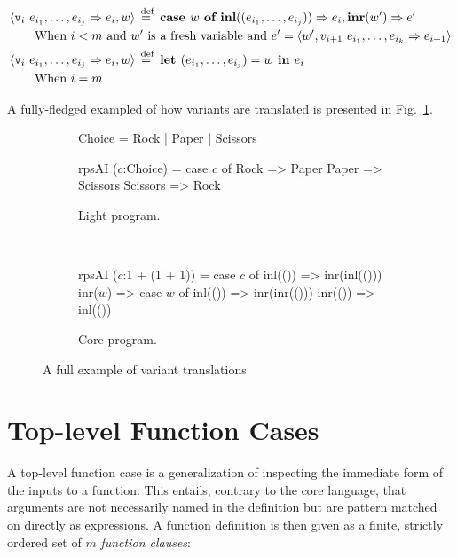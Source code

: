 \begin{align*}
  &\langle \texttt{v}_i~e_{i_1}, \dots, e_{i_j} \Rightarrow e_i, w \rangle \stackrel{\>\text{def}}{=}\>
  \textbf{case } w \textbf{ of } \textbf{inl}((e_{i_1}, \dots, e_{i_j})) \Rightarrow e_i, \textbf{inr}(w') \Rightarrow e' \\
  &\qquad\text{When $i < m$ and $w'$ is a fresh variable and $e' = \langle
          w', v_{i+1}~e_{i_1}, \dots, e_{i_k} \Rightarrow e_{i + 1} \rangle$} \\
  &\langle \texttt{v}_i~e_{i_1}, \dots, e_{i_j} \Rightarrow e_i, w \rangle \stackrel{\>\text{def}}{=}\>
  \textbf{let } (e_{i_1}, \dots, e_{i_j}) = w \textbf{ in } e_i \\
  &\qquad\text{When $i = m$}
\end{align*}

A fully-fledged exampled of how variants are translated is presented in
Fig.~\ref{fig:variant_translation}.

\begin{figure}[ht!]
  \centering
  \begin{subfigure}[b]{0.90\textwidth}
    \begin{rfuncodenum}
Choice = Rock | Paper | Scissors

rpsAI ($c$:Choice) =
  case $c$ of
    Rock => Paper
    Paper => Scissors
    Scissors => Rock
    \end{rfuncodenum}
    \caption{Light program.}
  \end{subfigure}
  ~
  \begin{subfigure}[b]{0.90\textwidth}
    \begin{rfuncodenum}
rpsAI ($c$:1 + (1 + 1)) =
  case $c$ of
    inl(()) => inr(inl(()))
    inr($w$) => case $w$ of
      inl(()) => inr(inr(()))
      inr(()) => inl(())
    \end{rfuncodenum}
    \caption{Core program.}
  \end{subfigure}
\caption{A full example of variant translations}\label{fig:variant_translation}
\end{figure}

\section{Top-level Function Cases}\label{subsec:top_level}

A top-level function case is a generalization of inspecting the immediate form
of the inputs to a function. This entails, contrary to the core language, that
arguments are not necessarily named in the definition but are pattern matched
on directly as expressions. A function definition is then given as a finite,
strictly ordered set of $m$ \emph{function clauses}:

